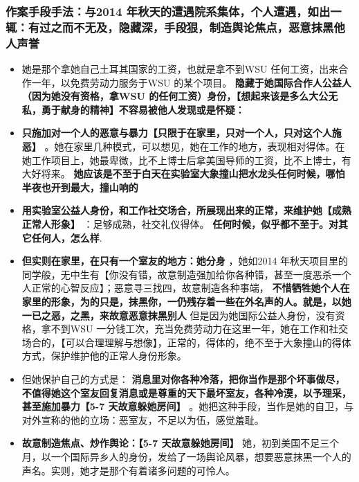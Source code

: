 \documentclass[9pt, b5paper]{article}
\begin{document}
\subsubsection{作案手段手法：与2014 年秋天的遭遇院系集体，个人遭遇，如出一辄：有过之而不无及，隐藏深，手段狠，制造舆论焦点，恶意抹黑他人声誉}
\label{sec-3-2-1}
\begin{itemize}
\item 她是那个拿她自己土耳其国家的工资，也就是拿不到WSU 任何工资，出来合作一年，以免费劳动力服务于WSU 的某个项目。 \textbf{隐藏于她国际合作人公益人（因为她没有资格，拿WSU 的任何工资）身份，【想起来该是多么大公无私，勇于献身的精神】不容易被他人发现或是怀疑：}
\item \textbf{只施加对一个人的恶意与暴力【只限于在家里，只对一个人，只对这个人施恶】} 。她在家里几种模式，可以想见，她在工作的地方，表现相对得体。在她工作项目上，她最卑微，比不上博士后拿美国导师的工资，比不上博士，有大好将来。 \textbf{她应该是不至于白天在实验室大象撞山把水龙头任何时候，哪怕半夜也开到最大，撞山响的}
\item \textbf{用实验室公益人身份，和工作社交场合，所展现出来的正常，来维护她【成熟正常人形象】} ：足够成熟，社交礼仪得体。 \textbf{任何时候，似乎都不至于。对其它任何人，怎么样}.
\item \textbf{但实则在家里，在只有一个室友的地方：她分身} ，她如2014 年秋天项目里的同学般，无中生有【你没有错，故意制造强加给你各种错，甚至一度恶杀一个人正常的心智反应】；恶意寻三找四，故意制造各种事端， \textbf{不惜牺牲她个人在家里的形象，为的只是，抹黑你，一仍残存着一些在外名声的人。就是，以她一已之恶，之黑，来故意恶意抹黑别人} 但是因为她国际公益人身份，没有资格，拿不到WSU 一分钱工次，充当免费劳动力在这里一年，她在工作和社交场合的，【可以合理理解与想像】，正常的，得体的，绝不至于大象撞山的得体方式，保护维护他的正常人身份形象。
\item 但她保护自己的方式是： \textbf{消息里对你各种冷落，把你当作是那个坏事做尽，不值得她这个室友回复消息或是尊重的天下最坏室友，各种冷漠，以予理采，甚至施加暴力【5-7 天故意躲她房间】} 。她把这种手段，当作是她的自卫，与对外宣称的他的立场：恶室友，不足以为伍，感觉羞耻。
\item \textbf{故意制造焦点、炒作舆论：【5-7 天故意躲她房间】} 她，初到美国不足三个月，以一个国际异乡人的身份，发给了一场舆论风暴，想要恶意抹黑一个人的声名。实则，她才是那个有着诸多问题的可怜人。
\end{itemize}
\end{document}
